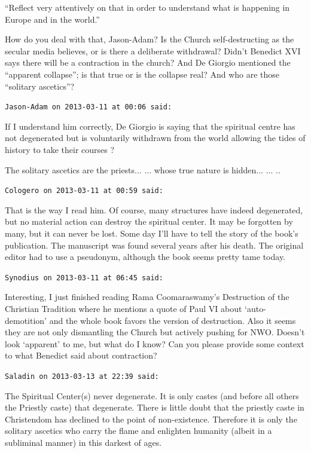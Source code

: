 \begin{footnotesize}
\begin{sffamily}
``Reflect very attentively on that in order to understand what is happening in Europe and in the world.''

How do you deal with that, Jason-Adam? Is the Church self-destructing as the secular media believes, or is there a deliberate withdrawal? Didn't Benedict XVI says there will be a contraction in the church? And De Giorgio mentioned the ``apparent collapse''; is that true or is the collapse real? And who are those ``solitary ascetics''?

\hfill

\texttt{Jason-Adam on 2013-03-11 at 00:06 said:}

If I understand him correctly, De Giorgio is saying that the spiritual centre has not degenerated but is voluntarily withdrawn from the world allowing the tides of history to take their courses ?

The solitary ascetics are the priests... ... whose true nature is hidden... ... ..

\hfill

\texttt{Cologero on 2013-03-11 at 00:59 said:}

That is the way I read him. Of course, many structures have indeed degenerated, but no material action can destroy the spiritual center. It may be forgotten by many, but it can never be lost. Some day I'll have to tell the story of the book's publication. The manuscript was found several years after his death. The original editor had to use a pseudonym, although the book seems pretty tame today.

\hfill

\texttt{Synodius on 2013-03-11 at 06:45 said:}

Interesting, I just finished reading Rama Coomaraswamy's Destruction of the Christian Tradition where he mentions a quote of Paul VI about `auto-demotition' and the whole book favors the version of destruction. Also it seems they are not only dismantling the Church but actively pushing for NWO. Doesn't look `apparent' to me, but what do I know? Can you please provide some context to what Benedict said about contraction?

\hfill

\texttt{Saladin on 2013-03-13 at 22:39 said:}

The Spiritual Center(s) never degenerate. It is only castes (and before all others the Priestly caste) that degenerate. There is little doubt that the priestly caste in Christendom has declined to the point of non-existence. Therefore it is only the solitary ascetics who carry the flame and enlighten humanity (albeit in a subliminal manner) in this darkest of ages.


\end{sffamily}
\end{footnotesize}
